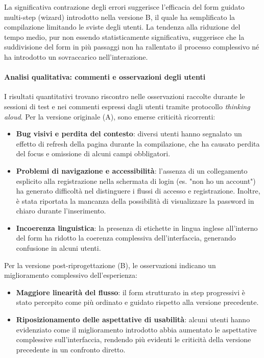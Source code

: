 La significativa contrazione degli errori suggerisce l'efficacia del form guidato multi-step (wizard) introdotto nella versione B, il quale ha semplificato la compilazione limitando le sviste degli utenti. La tendenza alla riduzione del tempo medio, pur non essendo statisticamente significativa, suggerisce che la suddivisione del form in più passaggi non ha rallentato il processo complessivo né ha introdotto un sovraccarico nell'interazione.

\paragraph{Analisi qualitativa: commenti e osservazioni degli utenti}

I risultati quantitativi trovano riscontro nelle osservazioni raccolte durante le sessioni di test e nei commenti espressi dagli utenti tramite protocollo \textit{thinking aloud}. Per la versione originale (A), sono emerse criticità ricorrenti:

\begin{itemize}
	\item \textbf{Bug visivi e perdita del contesto}: diversi utenti hanno segnalato un effetto di refresh della pagina durante la compilazione, che ha causato perdita del focus e omissione di alcuni campi obbligatori.

	\item \textbf{Problemi di navigazione e accessibilità}: l’assenza di un collegamento esplicito alla registrazione nella schermata di login (es. "non ho un account") ha generato difficoltà nel distinguere i flussi di accesso e registrazione. Inoltre, è stata riportata la mancanza della possibilità di visualizzare la password in chiaro durante l’inserimento.

	\item \textbf{Incoerenza linguistica}: la presenza di etichette in lingua inglese all’interno del form ha ridotto la coerenza complessiva dell’interfaccia, generando confusione in alcuni utenti.
\end{itemize}

Per la versione post-riprogettazione (B), le osservazioni indicano un miglioramento complessivo dell’esperienza:

\begin{itemize}
	\item \textbf{Maggiore linearità del flusso}: il form strutturato in step progressivi è stato percepito come più ordinato e guidato rispetto alla versione precedente.

	\item \textbf{Riposizionamento delle aspettative di usabilità}: alcuni utenti hanno evidenziato come il miglioramento introdotto abbia aumentato le aspettative complessive sull’interfaccia, rendendo più evidenti le criticità della versione precedente in un confronto diretto.
\end{itemize}

